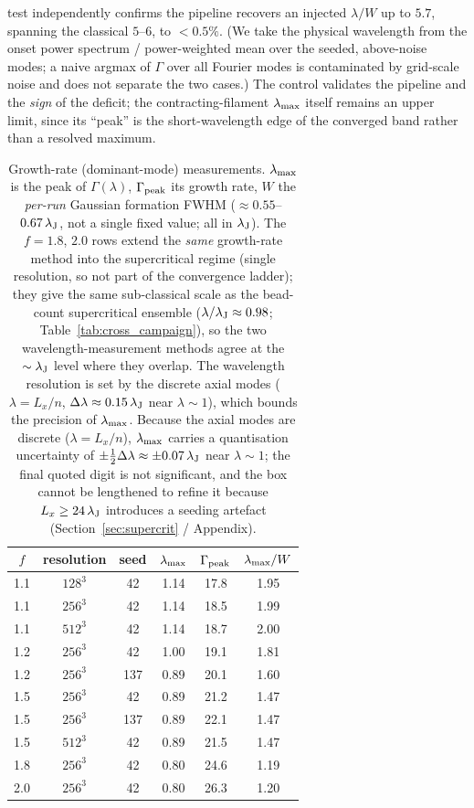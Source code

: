 \documentclass[usenatbib,twoside,twocolumn]{mnras}
\begin{document}
test independently confirms the pipeline recovers an injected $\lambda/W$ up to $5.7$, spanning the classical $5$--$6$, to $<0.5\%$. (We take the physical wavelength from the onset power spectrum / power-weighted mean over the seeded, above-noise modes; a naive argmax of $\Gamma$ over all Fourier modes is contaminated by grid-scale noise and does not separate the two cases.) The control validates the pipeline and the \emph{sign} of the deficit; the contracting-filament $\lambda_{\rm max}$ itself remains an upper limit, since its ``peak'' is the short-wavelength edge of the converged band rather than a resolved maximum.

\begin{table}
\caption{Growth-rate (dominant-mode) measurements. $\lambda_{\rm max}$ is the peak of $\Gamma(\lambda)$, $\Gamma_{\rm peak}$ its growth rate, $W$ the \emph{per-run} Gaussian formation FWHM ($\approx0.55$--$0.67\,\lambda_{\rm J}$, not a single fixed value; all in $\lambda_{\rm J}$). The $f=1.8$, $2.0$ rows extend the \emph{same} growth-rate method into the supercritical regime (single resolution, so not part of the convergence ladder); they give the same sub-classical scale as the bead-count supercritical ensemble ($\lambda/\lambda_{\rm J}\approx0.98$; Table~\ref{tab:cross_campaign}), so the two wavelength-measurement methods agree at the $\sim\lambda_{\rm J}$ level where they overlap. The wavelength resolution is set by the discrete axial modes ($\lambda=L_x/n$, $\Delta\lambda\approx0.15\,\lambda_{\rm J}$ near $\lambda\sim1$), which bounds the precision of $\lambda_{\rm max}$. Because the axial modes are discrete ($\lambda=L_x/n$), $\lambda_{\rm max}$ carries a quantisation uncertainty of $\pm\tfrac12\Delta\lambda\approx\pm0.07\,\lambda_{\rm J}$ near $\lambda\sim1$; the final quoted digit is not significant, and the box cannot be lengthened to refine it because $L_x\geq24\,\lambda_{\rm J}$ introduces a seeding artefact (Section~\ref{sec:supercrit} / Appendix).}
\label{tab:wave}
\footnotesize
\setlength{\tabcolsep}{4pt}
\begin{tabular}{cccccc}
\toprule
$f$ & resolution & seed & $\lambda_{\rm max}$ & $\Gamma_{\rm peak}$ & $\lambda_{\rm max}/W$ \\
\midrule
1.1 & $128^3$ & 42  & 1.14 & 17.8 & 1.95 \\
1.1 & $256^3$ & 42  & 1.14 & 18.5 & 1.99 \\
1.1 & $512^3$ & 42  & 1.14 & 18.7 & 2.00 \\
1.2 & $256^3$ & 42  & 1.00 & 19.1 & 1.81 \\
1.2 & $256^3$ & 137 & 0.89 & 20.1 & 1.60 \\
1.5 & $256^3$ & 42  & 0.89 & 21.2 & 1.47 \\
1.5 & $256^3$ & 137 & 0.89 & 22.1 & 1.47 \\
1.5 & $512^3$ & 42  & 0.89 & 21.5 & 1.47 \\
1.8 & $256^3$ & 42  & 0.80 & 24.6 & 1.19 \\
2.0 & $256^3$ & 42  & 0.80 & 26.3 & 1.20 \\
\bottomrule
\end{tabular}
\end{table}
\end{document}
